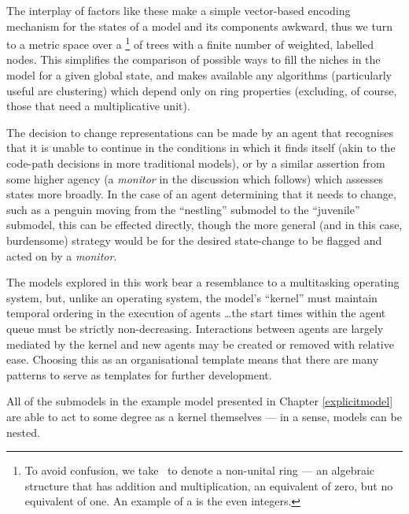 The interplay of factors like these make a simple vector-based
encoding mechanism for the states of a model and its components
awkward, thus we turn to a metric space over a \rng\footnote{To avoid
confusion, we take \rng\ to denote a non-unital ring --- an algebraic
structure that has addition and multiplication, an equivalent of zero,
but no equivalent of one.  An example of a \rng is the even integers.}
of trees with a finite number of weighted, labelled nodes. This
simplifies the comparison of possible ways to fill the niches in the
model for a given global state, and makes available any algorithms
(particularly useful are clustering) which depend only on ring
properties (excluding, of course, those that need a multiplicative
unit).

The decision to change representations can be made by an agent that
recognises that it is unable to continue in the conditions in which it
finds itself (akin to the code-path decisions in more traditional
models), or by a similar assertion from some higher agency
(a \emph{monitor} in the discussion which follows) which assesses
states more broadly.  In the case of an agent determining that it
needs to change, such as a penguin moving from the ``nestling''
submodel to the ``juvenile'' submodel, this can be effected directly,
though the more general (and in this case, burdensome) strategy would
be for the desired state-change to be flagged and acted on by
a \emph{monitor}.

The models explored in this work bear a resemblance to a multitasking
operating system, but, unlike an operating system, the model's ``kernel''
must maintain temporal ordering in the execution of agents \ldots the
start times within the agent queue must be strictly non-decreasing.
Interactions between agents are largely mediated by the kernel and
new agents may be created or removed with relative ease.  Choosing
this as an organisational template means that there are many patterns
to serve as templates for further development.

All of the submodels in the example model presented in
Chapter \ref{explicitmodel} are able to act to some degree as a kernel
themselves --- in a sense, models can be nested.

